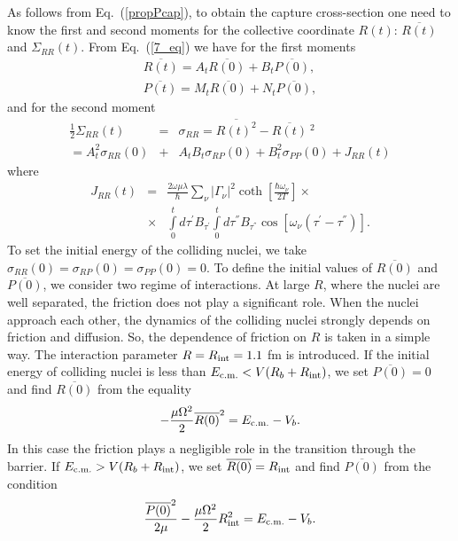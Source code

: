 \documentclass[preprint,review,12pt]{elsarticle}
\begin{document}
  As follows from Eq.~(\ref{propPcap}), to obtain the capture cross-section one need to know the first and second moments for the collective coordinate $R(t)$:
  $\overline{R(t)}$ and $\Sigma_{RR}(t)$.
  From Eq.~(\ref{7_eq}) we have for the first moments
  \begin{eqnarray}
  \overline{R(t)}=A_t\overline{R(0)} + B_t \overline{P(0)}, \nonumber\\
  \overline{P(t)}=M_t \overline{R(0)} + N_t \overline{P(0)},
  \label{8_eq}
  \end{eqnarray}
  and for the second moment
  \begin{eqnarray}
  \frac{1}{2}\Sigma_{RR}(t)&=&\sigma_{RR}=\overline{R(t)^2}-\overline{R(t)}\ ^2\nonumber\\
  =A_t^2\sigma_{RR}(0)&+&A_t B_t\sigma_{RP}(0)+B_t^2\sigma_{PP}(0)+J_{RR}(t)
  \end{eqnarray}
  where
  \begin{eqnarray}
  J_{RR}(t)&=&\frac{2\omega\mu\lambda}{\hbar}
  \sum_{\nu}^{}|\Gamma_\nu|^2\coth\left[\frac{\hbar\omega_\nu}{2T}\right] \times \nonumber\\
&\times& \int\limits_{0}^{t}
  d\tau^{'}B_{\tau^{'}}  \int\limits_{0}^{t} d\tau^{''}B_{\tau^{''}}
  \cos[\omega_\nu (\tau^{'}-\tau^{''})].
  \label{Jrr}
  \end{eqnarray}
  To set the initial energy of the colliding nuclei, we take $\sigma_{RR}(0)=\sigma_{RP}(0)=\sigma_{PP}(0)=0$.
  To define the initial values of $\overline{R(0)}$ and $\overline{P(0)}$, we consider two regime of interactions.
  At large $R$, where the nuclei are well separated, 
  the friction does not play a significant role. When the nuclei approach each other,
  the dynamics of the colliding nuclei strongly depends on friction and diffusion. 
  So, the dependence of friction on $R$ is taken in a simple way.
  The interaction parameter $R=R_{\rm int}=1.1$ fm is introduced. If the initial energy of colliding nuclei is less than
  $E_{\rm c.m.}<V(R_b+R_{\rm int})$, we set $\overline{P(0)}=0$ and find $\overline{R(0)}$ from the equality 
  $$-\dfrac{\mu \Omega^2}{2}\overline{R(0)}^2=E_{\rm c.m.}-V_b.$$
  In this case the friction plays a negligible role in the transition through the
  barrier.
  If $E_{\rm c.m.}>V(R_b+R_{\rm int})$, we set $\overline{R(0)}=R_{\rm int}$ and find $\overline{P(0)}$ 
  from the condition
  $$\dfrac{\overline{P(0)}^2}{2 \mu}-\dfrac{\mu \Omega^2}{2}R_{\rm int}^2=E_{\rm c.m.}-V_b.$$
\end{document}
